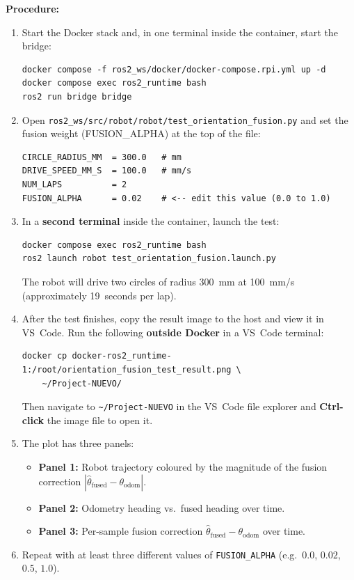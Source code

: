 \documentclass[12pt,letterpaper]{article}
\begin{document}
\textbf{Procedure:}
\begin{enumerate}
  \item Start the Docker stack and, in one terminal inside the container,
        start the bridge:
\begin{lstlisting}[style=bash]
docker compose -f ros2_ws/docker/docker-compose.rpi.yml up -d
docker compose exec ros2_runtime bash
ros2 run bridge bridge
\end{lstlisting}
  \item Open \texttt{ros2\_ws/src/robot/robot/test\_orientation\_fusion.py}
        and set the fusion weight (FUSION\_ALPHA) at the top of the file:
\begin{lstlisting}[style=python, caption={Tunable parameters in test\_orientation\_fusion.py}]
CIRCLE_RADIUS_MM  = 300.0   # mm
DRIVE_SPEED_MM_S  = 100.0   # mm/s
NUM_LAPS          = 2
FUSION_ALPHA      = 0.02    # <-- edit this value (0.0 to 1.0)
\end{lstlisting}
  \item In a \textbf{second terminal} inside the container, launch the test:
\begin{lstlisting}[style=bash]
docker compose exec ros2_runtime bash
ros2 launch robot test_orientation_fusion.launch.py
\end{lstlisting}
        The robot will drive two circles of radius 300~mm at 100~mm/s
        (approximately 19~seconds per lap).
  \item After the test finishes, copy the result image to the host and view
        it in VS~Code.  Run the following \textbf{outside Docker} in a
        VS~Code terminal:
\begin{lstlisting}[style=bash]
docker cp docker-ros2_runtime-1:/root/orientation_fusion_test_result.png \
    ~/Project-NUEVO/
\end{lstlisting}
        Then navigate to \texttt{\textasciitilde/Project-NUEVO} in the
        VS~Code file explorer and \textbf{Ctrl-click} the image file to
        open it.
  \item The plot has three panels:
        \begin{itemize}
          \item \textbf{Panel 1:} Robot trajectory coloured by the magnitude of
                the fusion correction $|\hat\theta_{\text{fused}} - \theta_{\text{odom}}|$.
          \item \textbf{Panel 2:} Odometry heading vs.\ fused heading over
                time.
          \item \textbf{Panel 3:} Per-sample fusion correction
                $\hat\theta_{\text{fused}} - \theta_{\text{odom}}$ over time.
        \end{itemize}
  \item Repeat with at least three different values of \texttt{FUSION\_ALPHA}
        (e.g.\ $0.0$, $0.02$, $0.5$, $1.0$).
\end{enumerate}
\end{document}
